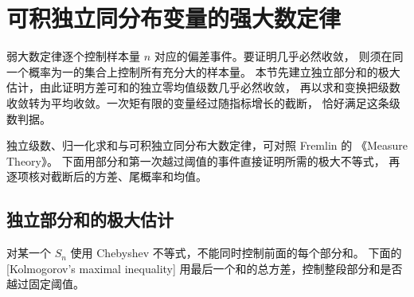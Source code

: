 \section{可积独立同分布变量的强大数定律}
\label{b1:sec:3005}

弱大数定律逐个控制样本量 \(n\) 对应的偏差事件。要证明几乎必然收敛，
则须在同一个概率为一的集合上控制所有充分大的样本量。
本节先建立独立部分和的极大估计，由此证明方差可和的独立零均值级数几乎必然收敛，
再以求和变换把级数收敛转为平均收敛。一次矩有限的变量经过随指标增长的截断，
恰好满足这条级数判据。

\ProseParagraphBreak

独立级数、归一化求和与可积独立同分布大数定律，可对照 Fremlin 的
《Measure Theory》\cite[273B(b), 273C--273D, 273I]{Fremlin2016Measure}。
下面用部分和第一次越过阈值的事件直接证明所需的极大不等式，
再逐项核对截断后的方差、尾概率和均值。

\subsection{独立部分和的极大估计}
\label{b1:subsec:300501}

对某一个 \(S_n\) 使用 Chebyshev 不等式，不能同时控制前面的每个部分和。
下面的[Kolmogorov's maximal inequality]
用最后一个和的总方差，控制整段部分和是否越过固定阈值。

